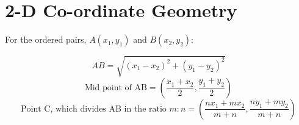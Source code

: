 \large{\chapter{2-D Co-ordinate Geometry}}
For the ordered pairs, $A(x_1,y_1)$ and $B(x_2,y_2)$:

\begin{equation}
	AB = \sqrt{(x_1-x_2)^2+(y_1-y_2)^2}
\end{equation}
\begin{equation}
	\text{Mid point of AB} = (\dfrac{x_1+x_2}{2},\dfrac{y_1+y_2}{2})
\end{equation}
\begin{equation}
	\text{Point C, which divides AB in the ratio }m:n = (\dfrac{nx_1+mx_2}{m+n},\dfrac{ny_1+my_2}{m+n})
\end{equation}
